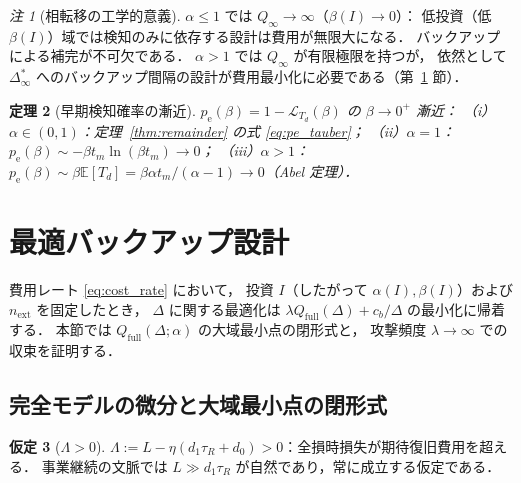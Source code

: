 \documentclass[12pt,a4paper]{article}
\theoremstyle{plain}
\newtheorem{theorem}{定理}[section]
\theoremstyle{definition}
\newtheorem{assumption}[theorem]{仮定}
\theoremstyle{remark}
\newtheorem{remark}[theorem]{注}
\newcommand{\E}{\mathbb{E}}
\newcommand{\calL}{\mathcal{L}}
\newcommand{\pe}{p_{\mathrm{e}}}
\newcommand{\Qf}{Q_{\mathrm{full}}}
\newcommand{\Qinf}{Q_{\infty}}
\newcommand{\betaI}{\beta(I)}
\newcommand{\Dinf}{\Delta^{*}_{\infty}}
\newcommand{\La}{\Lambda}   %
\begin{document}
\begin{remark}[相転移の工学的意義]\label{rem:phase}
$\alpha\le1$ では $\Qinf\to\infty$（$\betaI\to0$）：
低投資（低 $\betaI$）域では検知のみに依存する設計は費用が無限大になる．
バックアップによる補完が不可欠である．
$\alpha>1$ では $\Qinf$ が有限極限を持つが，
依然として $\Dinf$ へのバックアップ間隔の設計が費用最小化に必要である（第~\ref{sec:opt} 節）．
\end{remark}

\begin{theorem}[早期検知確率の漸近]\label{thm:pe_asym}
$\pe(\beta)=1-\calL_{T_d}(\beta)$ の $\beta\to0^+$ 漸近：
（i）$\alpha\in(0,1)$：定理~\ref{thm:remainder} の式 \eqref{eq:pe_tauber}；
（ii）$\alpha=1$：$\pe(\beta)\sim-\beta t_m\ln(\beta t_m)\to0$；
（iii）$\alpha>1$：$\pe(\beta)\sim\beta\E[T_d]=\beta\alpha t_m/(\alpha-1)\to0$（Abel 定理）．
\end{theorem}

\section{最適バックアップ設計}
\label{sec:opt}

費用レート \eqref{eq:cost_rate} において，
投資 $I$（したがって $\alpha(I),\beta(I)$）および $n_{\mathrm{ext}}$ を固定したとき，
$\Delta$ に関する最適化は $\lambda\Qf(\Delta)+c_b/\Delta$ の最小化に帰着する．
本節では $\Qf(\Delta;\alpha)$ の大域最小点の閉形式と，
攻撃頻度 $\lambda\to\infty$ での収束を証明する．

\subsection{完全モデルの微分と大域最小点の閉形式}

\begin{assumption}[$\La>0$]\label{ass:Lambda}
$\La:=L-\eta(d_1\tau_R+d_0)>0$：全損時損失が期待復旧費用を超える．
事業継続の文脈では $L\gg d_1\tau_R$ が自然であり，常に成立する仮定である．
\end{assumption}
\end{document}
